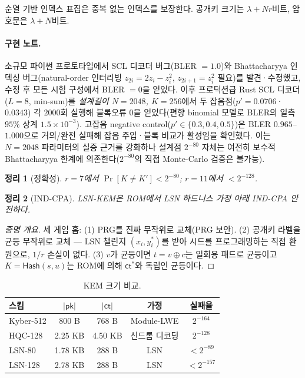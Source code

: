 \documentclass[11pt,a4paper]{article}
\theoremstyle{plain}
\newtheorem{theorem}{정리}[section]
\theoremstyle{definition}
\begin{document}
순열 기반 인덱스 표집은 중복 없는 인덱스를 보장한다. 공개키 크기는 $\lambda + Nr$비트, 암호문은 $\lambda + N$비트.

\paragraph{구현 노트.} 소규모 파이썬 프로토타입에서 SCL 디코더 버그(BLER $=1.0$)와 Bhattacharyya 인덱싱 버그(natural-order 인터리빙 $z_{2i}=2z_i-z_i^2$, $z_{2i+1}=z_i^2$ 필요)를 발견·수정했고, 수정 후 모든 시험 구성에서 BLER $=0$을 얻었다. 이후 프로덕션급 Rust SCL 디코더($L=8$, min-sum)를 \emph{설계길이 $N=2048$, $K=256$}에서 두 잡음점($p'=0.0706$·$0.0343$) 각 $2000$회 실행해 블록오류 $0$을 얻었다(편향 binomial 모델로 BLER의 일측 $95\%$ 상계 $1.5\times10^{-3}$). 고잡음 negative control($p'\in\{0.3,0.4,0.5\}$)은 BLER $0.965$--$1.000$으로 거의/완전 실패해 잡음 주입·블록 비교가 활성임을 확인했다. 이는 $N=2048$ 파라미터의 실증 근거를 강화하나 설계점 $2^{-80}$ 자체는 여전히 보수적 Bhattacharyya 한계에 의존한다($2^{-80}$의 직접 Monte-Carlo 검증은 불가능).

\begin{theorem}[정확성]
$r=7$에서 $\Pr[K \neq K'] < 2^{-80}$; $r=11$에서 $< 2^{-128}$.
\end{theorem}

\begin{theorem}[IND-CPA]
LSN-KEM은 ROM에서 LSN 하드니스 가정 아래 IND-CPA 안전하다.
\end{theorem}

\begin{proof}[증명 개요]
세 게임 홉: (1) PRG를 진짜 무작위로 교체(PRG 보안). (2) 공개키 라벨을 균등 무작위로 교체 --- LSN 챌린지 $(x_i, y_i^*)$를 받아 시드를 프로그래밍하는 직접 환원으로, $1/r$ 손실이 없다. (3) $v$가 균등이면 $t = v\oplus c$는 일회용 패드로 균등이고 $K = \mathsf{Hash}(s,u)$는 ROM에 의해 $\mathsf{ct}^*$와 독립인 균등이다.
\end{proof}

\begin{table}[ht]
\centering
\caption{KEM 크기 비교.}
\begin{tabular}{@{}lcccc@{}}
\hline
스킴 & $|\mathsf{pk}|$ & $|\mathsf{ct}|$ & 가정 & 실패율 \\
\hline
Kyber-512 & 800 B & 768 B & Module-LWE & $2^{-164}$ \\
HQC-128 & 2.25 KB & 4.50 KB & 신드롬 디코딩 & $2^{-128}$ \\
LSN-80 & 1.78 KB & 288 B & LSN & $< 2^{-89}$ \\
LSN-128 & 2.78 KB & 288 B & LSN & $< 2^{-157}$ \\
\hline
\end{tabular}
\end{table}
\end{document}

